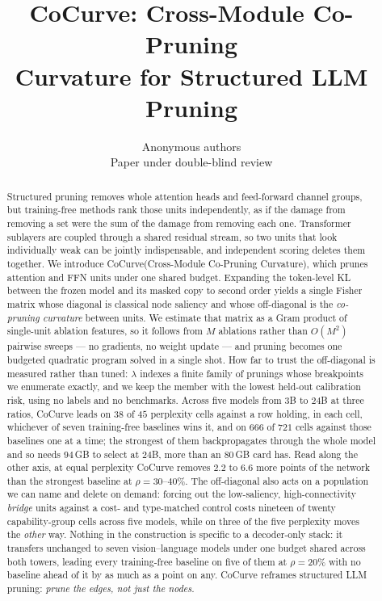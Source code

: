 \documentclass{article} %
\title{CoCurve: Cross-Module Co-Pruning\\ Curvature for Structured LLM Pruning}
\author{Anonymous authors\\Paper under double-blind review}
\newcommand{\method}{CoCurve\xspace}
\theoremstyle{plain}
\theoremstyle{remark}
\begin{document}
\maketitle

\begin{abstract}
Structured pruning removes whole attention heads and feed-forward channel groups, but training-free
methods rank those units independently, as if the damage from removing a set were the sum of the damage
from removing each one. Transformer sublayers are coupled through a shared residual stream, so two units
that look individually weak can be jointly indispensable, and independent scoring deletes them together.
We introduce \method (Cross-Module Co-Pruning Curvature), which prunes attention and FFN units under one
shared budget. Expanding the token-level KL between the frozen model and its masked copy to second order
yields a single Fisher matrix whose diagonal is classical node saliency and whose off-diagonal is the
\emph{co-pruning curvature} between units. We estimate that matrix as a Gram product of single-unit
ablation features, so it follows from $M$ ablations rather than $O(M^2)$ pairwise sweeps --- no gradients, no
weight update --- and pruning becomes one budgeted quadratic program solved in a single shot. How far to
trust the off-diagonal is measured rather than tuned: $\lambda$ indexes a finite family of prunings
whose breakpoints we enumerate exactly, and we keep the member with the lowest held-out calibration
risk, using no labels and no benchmarks.
Across five models from $3$B to $24$B at three ratios, \method leads on $38$ of $45$
perplexity cells against a row holding, in each cell, whichever of seven training-free baselines wins
it, and on $666$ of $721$ cells against those baselines one at a time; the strongest of them
backpropagates through the whole model and so needs $94$\,GB to select at $24$B, more than an $80$\,GB
card has. Read along the other axis, at equal perplexity \method removes $2.2$ to $6.6$ more
points of the network than the strongest baseline at $\rho{=}30$--$40\%$. The off-diagonal also acts on
a population we can name and delete on demand: forcing out the low-saliency, high-connectivity
\emph{bridge} units against a cost- and type-matched control costs nineteen of twenty capability-group
cells across five models, while on three of the five perplexity moves the \emph{other} way.
Nothing in the construction is specific to a decoder-only stack: it transfers unchanged to seven
vision--language models under one budget shared across both towers, leading every training-free
baseline on five of them at $\rho{=}20\%$ with no baseline ahead of it by as much as a point on any.
\method reframes structured LLM pruning: \emph{prune the edges, not just the nodes.}
\end{abstract}
\end{document}
